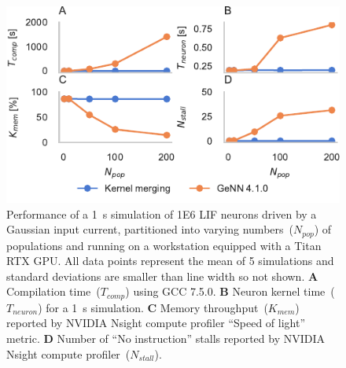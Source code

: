 \documentclass[9pt,a4paper]{amsart}
\begin{document}
\begin{figure}
    \centering
    \includegraphics{figures/merging_scaling}
    \caption{Performance of a \SI{1}{\second} simulation of \num{1E6} LIF neurons driven by a Gaussian input current, partitioned into varying numbers~($N_{pop}$) of populations and running on a workstation equipped with a Titan RTX GPU.
    All data points represent the mean of 5 simulations and standard deviations are smaller than line width so not shown.
    \textbf{A} Compilation time~($T_{comp}$) using GCC 7.5.0.
    \textbf{B} Neuron kernel time~($T_{neuron}$) for a \SI{1}{\second} simulation.
    \textbf{C} Memory throughput~($K_{mem}$) reported by NVIDIA Nsight compute profiler ``Speed of light'' metric.
    \textbf{D} Number of ``No instruction'' stalls reported by NVIDIA Nsight compute profiler~($N_{stall}$).}
    \label{fig:merging_scaling}
\end{figure}
\end{document}
